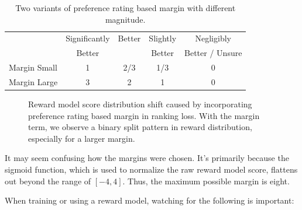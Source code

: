 \documentclass[
  letterpaper,
  numbers=noenddot,
  DIV=11,
  oneside]{scrreprt}
\theoremstyle{remark}
\begin{document}
\begin{longtable}[]{@{}lcccc@{}}
\caption{Two variants of preference rating based margin with different
magnitude.}\label{tbl-margin_nums}\tabularnewline
\toprule\noalign{}
\endfirsthead
\endhead
\bottomrule\noalign{}
\endlastfoot
& Significantly & Better & Slightly & Negligibly \\
& Better & & Better & Better / Unsure \\
Margin Small & 1 & 2/3 & 1/3 & 0 \\
Margin Large & 3 & 2 & 1 & 0 \\
\end{longtable}

\begin{figure}


\caption{\label{fig-margin-2}Reward model score distribution shift
caused by incorporating preference rating based margin in ranking loss.
With the margin term, we observe a binary split pattern in reward
distribution, especially for a larger margin.}

\end{figure}%

It may seem confusing how the margins were chosen. It's primarily
because the sigmoid function, which is used to normalize the raw reward
model score, flattens out beyond the range of \([-4, 4]\). Thus, the
maximum possible margin is eight.

When training or using a reward model, watching for the following is
important:
\end{document}
